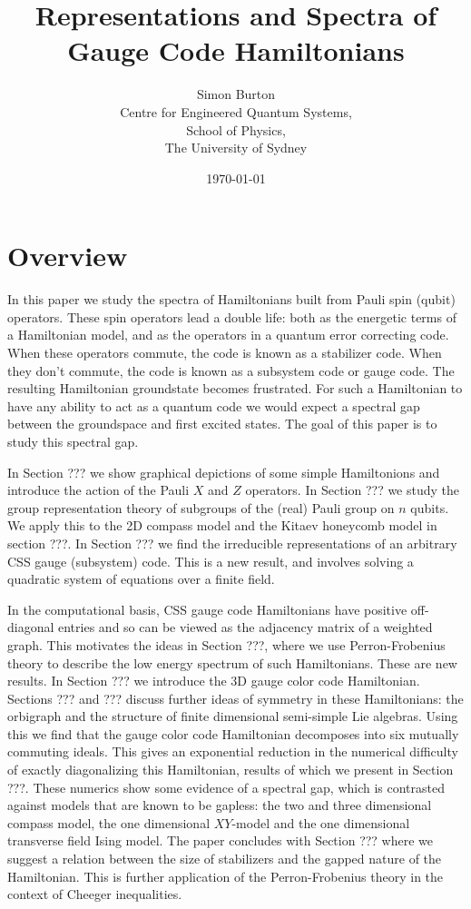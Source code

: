 \documentclass[11pt,oneside]{article}
\title{Representations and Spectra of Gauge Code Hamiltonians}
\author{Simon Burton\\
Centre for Engineered Quantum Systems,\\
School of Physics,\\
The University of Sydney}
\date{\today}
\begin{document}
\maketitle

\tableofcontents



\section{Overview}

In this paper we study the spectra of 
Hamiltonians built from Pauli spin (qubit) operators.
These spin operators lead a double life:
both as the energetic terms of a Hamiltonian model, and as
the operators in a quantum error correcting code.
When these operators commute, the code is known as a stabilizer code.
When they don't commute, the code is known as a subsystem code or gauge code.
The resulting Hamiltonian groundstate becomes frustrated.
For such a Hamiltonian to have any ability to act as a quantum
code we would expect a spectral gap between the
groundspace and first excited states.
The goal of this paper is to study this spectral gap.

In Section ??? we show graphical depictions of
some simple Hamiltonions and introduce the action of
the Pauli $X$ and $Z$ operators.
In Section ??? we study the group representation theory
of subgroups of the (real) Pauli group on $n$ qubits.
We apply this to the 2D compass model and the
Kitaev honeycomb model in section ???. 
In Section ??? we find the 
irreducible representations of an arbitrary CSS gauge (subsystem) code.
This is a new result, and involves solving a quadratic 
system of equations over a finite field.

In the computational basis, 
CSS gauge code Hamiltonians have positive off-diagonal
entries and so can be viewed as the adjacency matrix
of a weighted graph.
This motivates the ideas in Section ???, where 
we use Perron-Frobenius theory to
describe the low energy spectrum of such Hamiltonians.
These are new results.
In Section ??? we introduce the 3D gauge color code Hamiltonian.
Sections ??? and ??? discuss further ideas of
symmetry in these Hamiltonians: the orbigraph and
the structure of finite dimensional semi-simple Lie algebras.
Using this we find that the gauge color code Hamiltonian
decomposes into six mutually commuting ideals.
This gives an exponential reduction in the numerical
difficulty of exactly diagonalizing this Hamiltonian,
results of which we present in Section ???.
These numerics show some evidence of a spectral
gap, which is contrasted against models that are known
to be gapless: the two and three dimensional compass model,
the one dimensional $XY$-model and the one dimensional
transverse field Ising model.
The paper concludes with Section ??? where
we suggest a relation between the size of
stabilizers and the gapped nature of the Hamiltonian.
This is further application of the Perron-Frobenius 
theory in the context of Cheeger inequalities.
\end{document}
